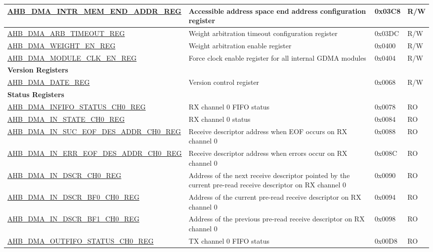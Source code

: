 \begin{longtable}{ | p{8cm} | p{8cm} | p{1.3cm} | p{1.5cm} | }
\hyperref[regdesc:AHBDMAINTRMEMENDADDRREG]{AHB\_DMA\_INTR\_MEM\_END\_ADDR\_REG} & Accessible address space end address configuration register & 0x03C8 & R/W \\ \hline
\hyperref[regdesc:AHBDMAARBTIMEOUTREG]{AHB\_DMA\_ARB\_TIMEOUT\_REG} & Weight arbitration timeout configuration register & 0x03DC & R/W \\ \hline
\hyperref[regdesc:AHBDMAWEIGHTENREG]{AHB\_DMA\_WEIGHT\_EN\_REG} & Weight arbitration enable register & 0x0400 & R/W \\ \hline
\hyperref[regdesc:AHBDMAMODULECLKENREG]{AHB\_DMA\_MODULE\_CLK\_EN\_REG} & Force clock enable register for all internal GDMA modules & 0x0404 & R/W \\ \hline
\multicolumn{4}{|l|}{\textbf{Version Registers}} \\ \hline
\hyperref[regdesc:AHBDMADATEREG]{AHB\_DMA\_DATE\_REG} & Version control register & 0x0068 & R/W \\ \hline
\multicolumn{4}{|l|}{\textbf{Status Registers}} \\ \hline
\hyperref[regdesc:AHBDMAINFIFOSTATUSCHNREG]{AHB\_DMA\_INFIFO\_STATUS\_CH0\_REG} & RX channel 0 FIFO status & 0x0078 & RO \\ \hline
\hyperref[regdesc:AHBDMAINSTATECHNREG]{AHB\_DMA\_IN\_STATE\_CH0\_REG} & RX channel 0 status & 0x0084 & RO \\ \hline
\hyperref[regdesc:AHBDMAINSUCEOFDESADDRCHNREG]{AHB\_DMA\_IN\_SUC\_EOF\_DES\_ADDR\_CH0\_REG} & Receive descriptor address when EOF occurs on RX channel 0 & 0x0088 & RO \\ \hline
\hyperref[regdesc:AHBDMAINERREOFDESADDRCHNREG]{AHB\_DMA\_IN\_ERR\_EOF\_DES\_ADDR\_CH0\_REG} & Receive descriptor address when errors occur on RX channel 0 & 0x008C & RO \\ \hline
\hyperref[regdesc:AHBDMAINDSCRCHNREG]{AHB\_DMA\_IN\_DSCR\_CH0\_REG} & Address of the next receive descriptor pointed by the current pre-read receive descriptor on RX channel 0 & 0x0090 & RO \\ \hline
\hyperref[regdesc:AHBDMAINDSCRBF0CHNREG]{AHB\_DMA\_IN\_DSCR\_BF0\_CH0\_REG} & Address of the current pre-read receive descriptor on RX channel 0 & 0x0094 & RO \\ \hline
\hyperref[regdesc:AHBDMAINDSCRBF1CHNREG]{AHB\_DMA\_IN\_DSCR\_BF1\_CH0\_REG} & Address of the previous pre-read receive descriptor on RX channel 0 & 0x0098 & RO \\ \hline
\hyperref[regdesc:AHBDMAOUTFIFOSTATUSCHNREG]{AHB\_DMA\_OUTFIFO\_STATUS\_CH0\_REG} & TX channel 0 FIFO status & 0x00D8 & RO \\ \hline

\end{longtable}
